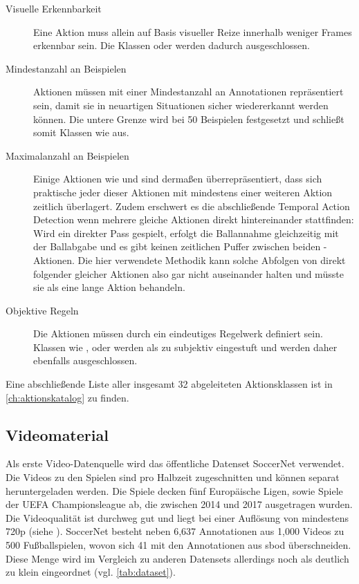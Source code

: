 \begin{description}
    \item[Visuelle Erkennbarkeit] Eine Aktion muss allein auf Basis visueller Reize innerhalb weniger Frames erkennbar sein.
    Die Klassen  oder  werden dadurch ausgeschlossen.
    \item[Mindestanzahl an Beispielen] Aktionen müssen mit einer Mindestanzahl an Annotationen repräsentiert sein, damit sie in neuartigen Situationen sicher wiedererkannt werden können.
    Die untere Grenze wird bei 50 Beispielen festgesetzt und schließt somit Klassen wie  aus.
    \item[Maximalanzahl an Beispielen] Einige Aktionen wie  und  sind dermaßen überrepräsentiert, dass sich praktische jeder dieser Aktionen mit mindestens einer weiteren Aktion zeitlich überlagert.
    Zudem erschwert es die abschließende Temporal Action Detection wenn mehrere gleiche Aktionen direkt hintereinander stattfinden:
    Wird \zB ein direkter Pass gespielt, erfolgt die Ballannahme gleichzeitig mit der Ballabgabe und es gibt keinen zeitlichen Puffer zwischen beiden -Aktionen.
    Die hier verwendete Methodik kann solche Abfolgen von direkt folgender gleicher Aktionen also gar nicht auseinander halten und müsste sie als eine lange Aktion behandeln.
    \item[Objektive Regeln] Die Aktionen müssen durch ein eindeutiges Regelwerk definiert sein.
    Klassen wie ,  oder  werden als zu subjektiv eingestuft und werden daher ebenfalls ausgeschlossen.
\end{description}

Eine abschließende Liste aller insgesamt 32 abgeleiteten Aktionsklassen ist in \autoref{ch:aktionskatalog} zu finden.

\subsection{Videomaterial}
\label{subsec:videomaterial}

Als erste Video-Datenquelle wird das öffentliche Datenset SoccerNet verwendet.
Die Videos zu den Spielen sind pro Halbzeit zugeschnitten und können separat heruntergeladen werden.
Die Spiele decken fünf Europäische Ligen, sowie Spiele der UEFA Championsleague ab, die zwischen 2014 und 2017 ausgetragen wurden.
Die Videoqualität ist durchweg gut und liegt bei einer Auflösung von mindestens 720p (siehe \cite{SoccerNet20}).
SoccerNet besteht neben 6,637 Annotationen aus 1,000 Videos zu 500 Fußballspielen, wovon sich 41 mit den Annotationen aus \gls{sbod} überschneiden.
Diese Menge wird im Vergleich zu anderen Datensets allerdings noch als deutlich zu klein eingeordnet (vgl. \autoref{tab:dataset}).

